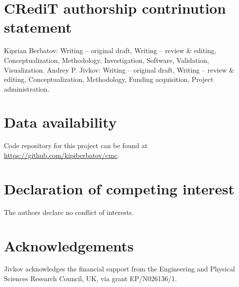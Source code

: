 \documentclass{elsarticle}
\theoremstyle{definition}
\begin{document}
\section*{CRediT authorship contrinution statement}

Kiprian Berbatov:
  Writing -- original draft,
  Writing -- review \& editing,
  Conceptualization,
  Methodology,
  Investigation,
  Software,
  Validation,
  Visualization.
Andrey P. Jivkov:
  Writing -- original draft,
  Writing -- review \& editing,
  Conceptualization,
  Methodology,
  Funding acquisition,
  Project administration.

\section*{Data availability}

Code repository for this project can be found at
\url{https://github.com/kipiberbatov/cmc}.

\section*{Declaration of competing interest}

The authors declare no conflict of interests.

\section*{Acknowledgements}

Jivkov acknowledges the financial support from the Engineering and Physical Sciences Research Council, UK, via grant EP/N026136/1.
\end{document}
